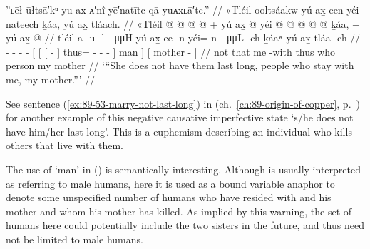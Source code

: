 \ex\label{ex:92-125-not-lasting-with-my-mother-around}%
%
\begingl
	\glpreamble	”ʟēł ūłtsā′kᵘ yu-ax-ᴀ′nî-yē′natītc-qā yuᴀxʟā′tc.” //
	\glpreamble	«\!Tléil ooltsáakw yú ax̱ een yéi nateech ḵáa, yú ax̱ tláach. //
	\gla	«\!Tléil  @ {} @ {} @ {} @ {} +
		{} yú {} {} ax̱  @ {} {}
			yéi @  @ {} @ {} @ {} @ {} {}
			ḵáa, {} +
		{} yú ax̱  @ {} {} //
	\glb	\pqp{}tléil a- u- l-  -μμH
		{} yú {} {} ax̱ ee -n {}
			yéi= n-  -μμL -ch {} {}
			ḵáaʷ {}
		{} yú ax̱ tláa -ch {} //
	\glc	\pqp{} - - -  -
		{}[  {}[ {}[   - {}]
			thus= -  - - \· {}]
			man {}]
		{}[   mother - {}] //
	\gld	\pqp{}not  {} {} {} {}
		{} that {} {} me {} -with {}
			thus  {} {} {} \·who {}
			person {}
		{} my mother {} {} //
	\glft	‘“She does not have them last long, people who stay with me, my mother.”’
		//
\endgl
\xe

See sentence (\ref{ex:89-53-marry-not-last-long}) in  (ch.\ \ref{ch:89-origin-of-copper}, p.\ \pageref{ex:89-53-marry-not-last-long}) for another example of this negative causative imperfective state  ‘s/he does not have him/her last long’.
This is a euphemism describing an individual who kills others that live with them.

The use of  ‘man’ in (\lastx) is semantically interesting.
Although  is usually interpreted as referring to male humans, here it is used as a bound variable anaphor to denote some unspecified number of humans who have resided with  and his mother and whom his mother has killed.
As implied by this warning, the set of humans here could potentially include the two sisters in the future, and thus  need not be limited to male humans.


